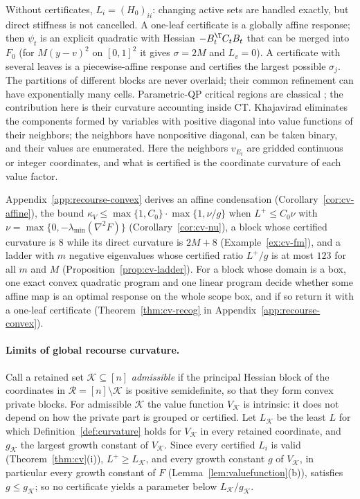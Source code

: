 \begin{remark}\label{rem:cv-instances}
Without certificates, $L_i=(H_0)_{ii}$: changing active sets are handled
exactly, but direct stiffness is not cancelled. A one-leaf certificate is a
globally affine response; then $\psi_t$ is an explicit quadratic with
Hessian $-B_t^{\T}C_tB_t$ that can be merged into $F_0$ (for $M(y-v)^2$ on
$[0,1]^2$ it gives $\sigma=2M$ and $L_v=0$). A certificate with several
leaves is a piecewise-affine response and certifies the largest possible
$\sigma_j$. The partitions of different blocks are never overlaid; their
common refinement can have exponentially many cells. Parametric-QP critical
regions are classical \cite{BemporadEtAl2002}; the contribution here is
their curvature accounting inside CT. Khajavirad \cite{Khajavirad2026PolyBox}
eliminates the components formed by variables with positive diagonal into
value functions of their neighbors; the neighbors have nonpositive diagonal,
can be taken binary, and their values are enumerated. Here the neighbors
$v_{E_t}$ are gridded continuous or integer coordinates, and what is
certified is the coordinate curvature of each value factor.
\end{remark}

Appendix~\ref{app:recourse-convex} derives an affine condensation
(Corollary~\ref{cor:cv-affine}), the bound
$\kappa_V\le\max\{1,C_0\}\cdot\max\{1,\nu/g\}$ when $L^+\le C_0\nu$ with
$\nu=\max\{0,-\lambda_{\min}(\nabla^2F)\}$ (Corollary~\ref{cor:cv-nu}), a
block whose certified curvature is $8$ while its direct curvature is $2M+8$
(Example~\ref{ex:cv-fm}), and a ladder with $m$ negative eigenvalues whose
certified ratio $L^+/g$ is at most $123$ for all $m$ and $M$
(Proposition~\ref{prop:cv-ladder}). For a block whose domain is a box, one
exact convex quadratic program and one linear program decide whether some
affine map is an optimal response on the whole scope box, and if so return
it with a one-leaf certificate (Theorem~\ref{thm:cv-recog} in
Appendix~\ref{app:recourse-convex}).

\paragraph{Limits of global recourse curvature.}
Call a retained set $\mathcal K\subseteq[n]$ \emph{admissible} if the
principal Hessian block of the coordinates in $\mathcal R=[n]\setminus\mathcal K$
is positive semidefinite, so that they form convex private blocks. For
admissible $\mathcal K$ the value function $V_{\mathcal K}$ is intrinsic: it
does not depend on how the private part is grouped or certified. Let
$L_{\mathcal K}$ be the least $L$ for which Definition~\ref{def:curvature}
holds for $V_{\mathcal K}$ in every retained coordinate, and
$g_{\mathcal K}$ the largest growth constant of $V_{\mathcal K}$. Since every
certified $L_i$ is valid (Theorem~\ref{thm:cv}(i)), $L^+\ge L_{\mathcal K}$,
and every growth constant $g$ of $V_{\mathcal K}$, in particular every growth
constant of $F$ (Lemma~\ref{lem:valuefunction}(b)), satisfies
$g\le g_{\mathcal K}$; so no certificate yields a parameter below
$L_{\mathcal K}/g_{\mathcal K}$.

